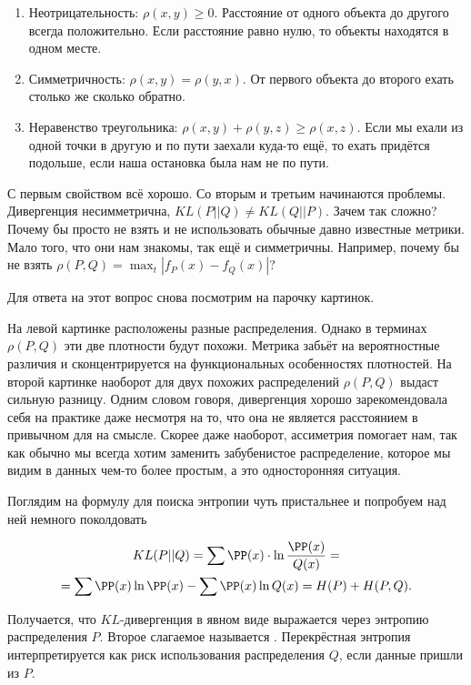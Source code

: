 \begin{enumerate}
\item   Неотрицательность: $\rho(x,y) \ge 0$. Расстояние от одного объекта до другого всегда положительно. Если расстояние равно нулю, то объекты находятся в одном месте. 

\item  Симметричность: $\rho(x,y) = \rho(y,x)$. От первого объекта до второго ехать столько же сколько обратно. 

\item  Неравенство треугольника: $\rho(x,y) + \rho(y,z) \ge \rho(x,z)$. Если мы ехали из одной точки в другую и по пути заехали куда-то ещё, то ехать придётся подольше, если наша остановка была нам не по пути. 
\end{enumerate}

С первым свойством всё хорошо. Со вторым и третьим начинаются проблемы. Дивергенция несимметрична, $KL(P || Q) \ne KL(Q || P)$. Зачем так сложно? Почему бы просто не взять и не использовать обычные давно известные метрики. Мало того, что они нам знакомы, так ещё и симметричны. Например, почему бы не взять $\rho(P,Q) = \max_t |f_P(x) - f_Q(x) |$? 

Для ответа на этот вопрос снова посмотрим на парочку картинок.



На левой картинке расположены разные распределения. Однако  в терминах $\rho(P,Q)$ эти две плотности будут похожи.  Метрика забьёт на вероятностные различия и сконцентрируется на функциональных особенностях плотностей. На второй картинке наоборот для двух похожих распределений $\rho(P,Q)$ выдаст сильную разницу. Одним словом говоря, дивергенция хорошо зарекомендовала себя на практике даже несмотря на то, что она не является расстоянием в привычном для на смысле. Скорее даже наоборот, ассиметрия помогает нам, так как обычно мы всегда хотим заменить забубенистое распределение, которое мы видим в данных чем-то более простым, а это односторонняя ситуация. 

Поглядим на формулу для поиска энтропии чуть пристальнее и попробуем над ней немного поколдовать

\begin{multline*}
KL(P || Q) = \sum \PP(x) \cdot \ln \frac{ \PP(x)}{Q(x)} = \\ = \sum \PP(x) \ln \PP(x) - \sum \PP(x) \ln Q(x) = H(P) + H(P,Q).
\end{multline*}

Получается, что $KL$-дивергенция в явном виде выражается через энтропию распределения $P$.  Второе слагаемое называется .  Перекрёстная энтропия интерпретируется как риск использования распределения $Q$, если данные пришли из $P$. 

